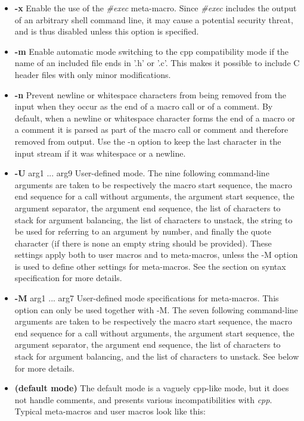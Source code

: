 \begin{itemize}
\item {\bf -x}\htmlBR
Enable the use of the {\it \#exec} meta-macro. Since {\it \#exec} includes the
output of an arbitrary shell command line, it may cause a potential security
threat, and is thus disabled unless this option is specified. 

\item {\bf -m}\htmlBR
Enable automatic mode switching to the cpp compatibility mode if the name of
an included file ends in '.h' or '.c'. This makes it possible to include C
header files with only minor modifications. 

\item {\bf -n}\htmlBR
Prevent newline or whitespace characters from being removed from the input
when they occur as the end of a macro call or of a comment. By default, when a
newline or whitespace character forms the end of a macro or a comment it is
parsed as part of the macro call or comment and therefore removed from output.
Use the -n option to keep the last character in the input stream if it was
whitespace or a newline. 

\item {\bf -U }arg1 ... arg9\htmlBR
User-defined mode. The nine following command-line arguments are taken to be
respectively the macro start sequence, the macro end sequence for a call
without arguments, the argument start sequence, the argument separator, the
argument end sequence, the list of characters to stack for argument balancing,
the list of characters to unstack, the string to be used for referring to an
argument by number, and finally the quote character (if there is none an empty
string should be provided). These settings apply both to user macros and to
meta-macros, unless the -M option is used to define other settings for
meta-macros. See the section on syntax specification for more details. 

\item {\bf -M }arg1 ... arg7\htmlBR
User-defined mode specifications for meta-macros. This option can only be used
together with -M. The seven following command-line arguments are taken to be
respectively the macro start sequence, the macro end sequence for a call
without arguments, the argument start sequence, the argument separator, the
argument end sequence, the list of characters to stack for argument balancing,
and the list of characters to unstack. See below for more details. 

\item {\bf (default mode)}\htmlBR
The default mode is a vaguely cpp-like mode, but it does not handle comments,
and presents various incompatibilities with {\it cpp}. Typical meta-macros and
user macros look like this: 


\end{itemize}

